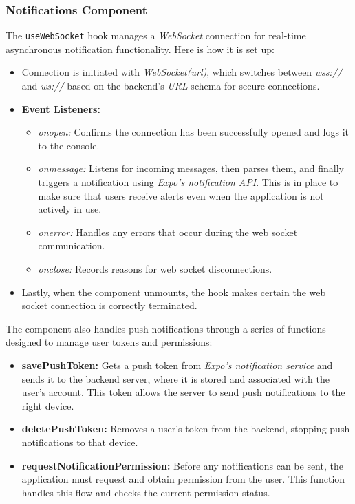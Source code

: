 \subsubsection{Notifications Component}

The \texttt{useWebSocket} hook manages a \textit{WebSocket} connection for real-time asynchronous notification functionality. Here is how it is set up:

\begin{itemize}
    \item Connection is initiated with \textit{WebSocket(url)}, which switches between \textit{wss://} and \textit{ws://} based on the backend's \textit{URL} schema for secure connections.
    \item \textbf{Event Listeners:}
        \begin{itemize}
            \item \textit{onopen:} Confirms the connection has been successfully opened and logs it to the console.
            \item \textit{onmessage:} Listens for incoming messages, then parses them, and finally triggers a notification using \textit{Expo's notification API}. This is in place to make sure that users receive alerts even when the application is not actively in use.
            \item \textit{onerror:} Handles any errors that occur during the web socket communication.
            \item \textit{onclose:} Records reasons for web socket disconnections.
        \end{itemize}
    \item Lastly, when the component unmounts, the hook makes certain the web socket connection is correctly terminated.
\end{itemize}

The component also handles push notifications through a series of functions designed to manage user tokens and permissions:

\begin{itemize}
    \item \textbf{savePushToken:} Gets a push token from \textit{Expo's notification service} and sends it to the backend server, where it is stored and associated with the user's account. This token allows the server to send push notifications to the right device.
    \item \textbf{deletePushToken:} Removes a user's token from the backend, stopping push notifications to that device.
    \item \textbf{requestNotificationPermission:} Before any notifications can be sent, the application must request and obtain permission from the user. This function handles this flow and checks the current permission status.
\end{itemize}

